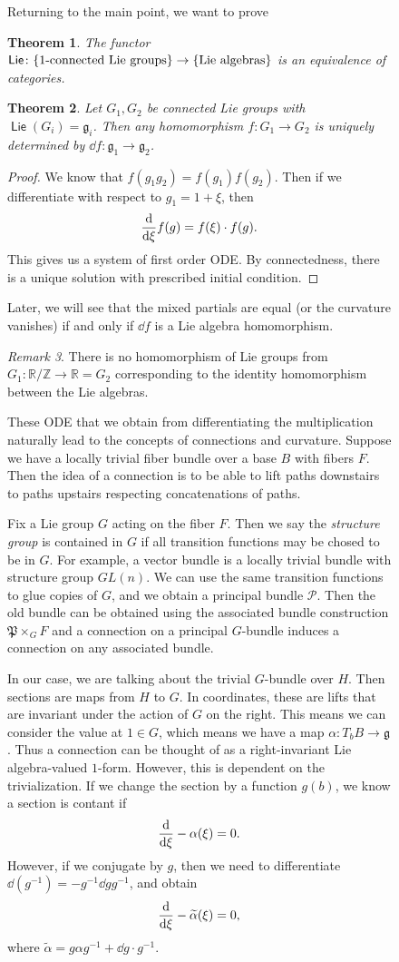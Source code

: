 \documentclass[leqno, openany]{memoir}
\newtheorem{thm}{Theorem}[section]
\theoremstyle{definition}
\theoremstyle{remark}
\newtheorem{rmk}[thm]{Remark}
\theoremstyle{plain}
\theoremstyle{definition}
\theoremstyle{remark}
\newcommand{\R}{\mathbb{R}}
\newcommand{\Z}{\mathbb{Z}}
\newcommand{\mc}[1]{\mathcal{#1}}
\newcommand{\mf}[1]{\mathfrak{#1}}
\newcommand{\wtl}[1]{\widetilde{#1}}
\DeclareMathOperator{\Lie}{\mathsf{Lie}}
\begin{document}
\begin{figure}[H]
Returning to the main point, we want to prove \begin{thm} The functor $\Lie
\colon \qty{ 1\text{-connected Lie groups} } \to \qty{\text{Lie algebras}}$ is
an equivalence of categories.  \end{thm}

\begin{thm} Let $G_1, G_2$ be connected Lie groups with $\Lie(G_i) = \mf{g}_i$.
Then any homomorphism $f \colon G_1 \to G_2$ is uniquely determined by $\dd f
\colon \mf{g}_1 \to \mf{g}_2$.  \end{thm}

\begin{proof} We know that $f(g_1 g_2) = f(g_1) f(g_2)$. Then if we
    differentiate with respect to $g_1 = 1 + \xi$, then \[ \dv{\xi} f(g) =
    f(\xi) \cdot f(g). \] This gives us a system of first order ODE. By
    connectedness, there is a unique solution with prescribed initial
    condition.  \end{proof}

Later, we will see that the mixed partials are equal (or the curvature
vanishes) if and only if $\dd f$ is a Lie algebra homomorphism.

\begin{rmk} There is no homomorphism of Lie groups from $G_1 \colon \R / \Z \to
\R = G_2$ corresponding to the identity homomorphism between the Lie algebras.
\end{rmk}

These ODE that we obtain from differentiating the multiplication naturally lead
to the concepts of connections and curvature. Suppose we have a locally trivial
fiber bundle over a base $B$ with fibers $F$. Then the idea of a connection is
to be able to lift paths downstairs to paths upstairs respecting concatenations
of paths.

Fix a Lie group $G$ acting on the fiber $F$. Then we say the \textit{structure
group} is contained in $G$ if all transition functions may be chosed to be in
$G$. For example, a vector bundle is a locally trivial bundle with structure
group $GL(n)$. We can use the same transition functions to glue copies of $G$,
and we obtain a principal bundle $\mc{P}$. Then the old bundle can be obtained
using the associated bundle construction $\mf{P} \times_G F$ and a connection
on a principal $G$-bundle induces a connection on any associated bundle.

In our case, we are talking about the trivial $G$-bundle over $H$. Then
sections are maps from $H$ to $G$. In coordinates, these are lifts that are
invariant under the action of $G$ on the right. This means we can consider the
value at $1 \in G$, which means we have a map $ \alpha \colon T_b B \to
\mf{g}$. Thus a connection can be thought of as a right-invariant Lie
algebra-valued $1$-form. However, this is dependent on the trivialization. If
we change the section by a function $g(b)$, we know a section is contant if \[
\dv{\xi} - \alpha(\xi) = 0. \] However, if we conjugate by $g$, then we need to
differentiate $\dd (g^{-1}) = - g^{-1} \dd{g} g^{-1}$, and obtain \[ \dv{\xi} -
\wtl{\alpha}(\xi) = 0, \] where $\wtl{\alpha} = g \alpha g^{-1} + \dd{g} \cdot
g^{-1}$.


\end{figure}
\end{document}
